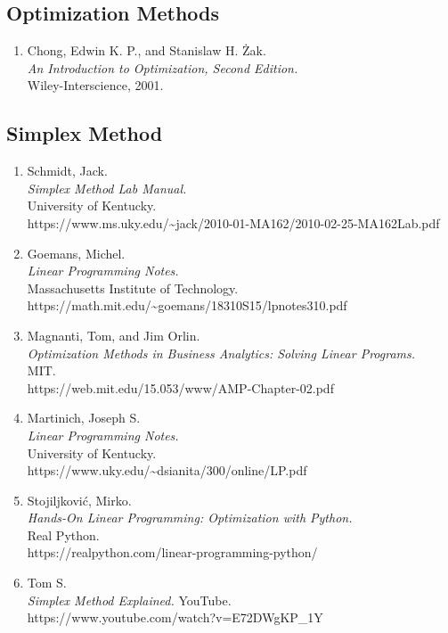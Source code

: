 \documentclass[11pt]{article}
\providecommand{\tightlist}{%
      \setlength{\itemsep}{0pt}\setlength{\parskip}{0pt}}
\begin{document}
\subsection{Optimization Methods}\label{optimization-methods}

\begin{enumerate}
\def\labelenumi{\arabic{enumi}.}
\setcounter{enumi}{7}
\tightlist
\item
  Chong, Edwin K. P., and Stanislaw H. Żak.\\
  \emph{An Introduction to Optimization, Second Edition.}\\
  Wiley-Interscience, 2001.
\end{enumerate}

\subsection{Simplex Method}\label{simplex-method}

\begin{enumerate}
\def\labelenumi{\arabic{enumi}.}
\setcounter{enumi}{8}
\item
  Schmidt, Jack.\\
  \emph{Simplex Method Lab Manual.}\\
  University of Kentucky.\\
  https://www.ms.uky.edu/\textasciitilde jack/2010-01-MA162/2010-02-25-MA162Lab.pdf
\item
  Goemans, Michel.\\
  \emph{Linear Programming Notes.}\\
  Massachusetts Institute of Technology.\\
  https://math.mit.edu/\textasciitilde goemans/18310S15/lpnotes310.pdf
\item
  Magnanti, Tom, and Jim Orlin.\\
  \emph{Optimization Methods in Business Analytics: Solving Linear
  Programs.}\\
  MIT.\\
  https://web.mit.edu/15.053/www/AMP-Chapter-02.pdf
\item
  Martinich, Joseph S.\\
  \emph{Linear Programming Notes.}\\
  University of Kentucky.\\
  https://www.uky.edu/\textasciitilde dsianita/300/online/LP.pdf
\item
  Stojiljković, Mirko.\\
  \emph{Hands-On Linear Programming: Optimization with Python.}\\
  Real Python.\\
  https://realpython.com/linear-programming-python/
\item
  Tom S.\\
  \emph{Simplex Method Explained.} YouTube.\\
  https://www.youtube.com/watch?v=E72DWgKP\_1Y
\end{enumerate}
\end{document}
